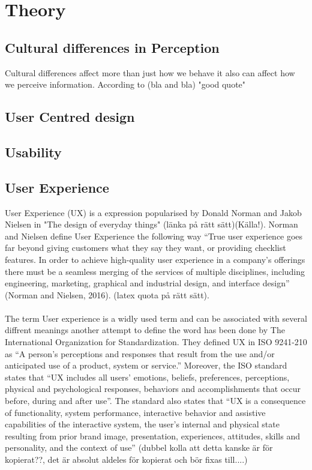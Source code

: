 
\chapter{Theory} %

\label{Chapter1} %




\section{Cultural differences in Perception}
Cultural differences affect more than just how we behave it also can affect how we perceive information. According to (bla and bla) "good quote" \cite{Holistic_vs_Analytic}
\section{User Centred design}
\section{Usability}
\section{User Experience}
User Experience (UX) is a expression popularised by Donald Norman and Jakob Nielsen in "The design of everyday things" (länka på rätt sätt)(Källa!). Norman and Nielsen define User Experience the following way “True user experience goes far beyond giving customers what they say they want, or providing checklist features. In order to achieve high-quality user experience in a company’s offerings there must be a seamless merging of the services of multiple disciplines, including engineering, marketing, graphical and industrial design, and interface design” (Norman and Nielsen, 2016). (latex quota på rätt sätt). 
\\\\
The term User experience is a widly used term and can be associated with several diffrent meanings another attempt to define the word has been done by The International Organization for Standardization. They defined UX in ISO 9241-210 as “A person's perceptions and responses that result from the use and/or anticipated use of a product, system or service.” Moreover, the ISO standard states that “UX includes all
users' emotions, beliefs, preferences, perceptions, physical and psychological
responses, behaviors and accomplishments that occur before, during and after use”. The standard also states that “UX is a consequence of
functionality, system performance, interactive behavior and assistive capabilities of the interactive system, the user's internal and physical state resulting from prior brand image, presentation,
experiences, attitudes, skills and personality, and the context of use” (dubbel kolla att detta kanske är för kopierat??, det är absolut aldeles för kopierat och bör fixas till....)

